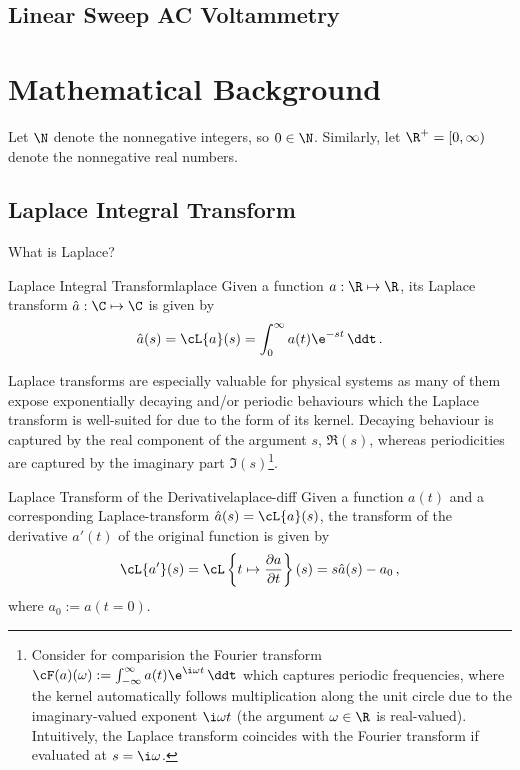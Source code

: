 \documentclass{prettytex/ox/mmsc-special-topic}
\begin{document}
  \subsection{Linear Sweep AC Voltammetry}

  \section{Mathematical Background}
  Let $\N$ denote the nonnegative integers, so $0 \in \N$.
  Similarly, let $\R^+ = [0, \infty)$ denote the nonnegative real numbers.

  \subsection{Laplace Integral Transform}
  What is Laplace?

  \begin{definition}{Laplace Integral Transform}{laplace}
    Given a function $a: \R \mapsto \R$, its Laplace transform $\hat{a}: \C \mapsto \C$ is given by
    $$\hat{a}(s) = \cL\{a\}(s) = \int_{0}^{\infty} a(t) \e^{-st} \,\ddt\,.$$
  \end{definition}

  Laplace transforms are especially valuable for physical systems as many of them expose exponentially decaying and/or periodic behaviours which the Laplace transform is well-suited for due to the form of its kernel.
  Decaying behaviour is captured by the real component of the argument $s$, $\Re(s)$, whereas periodicities are captured by the imaginary part $\Im(s)$\footnote{Consider for comparision the Fourier transform $\cF(a)(\omega) := \int_{-\infty}^{\infty} a(t) \e^{\i \omega t} \,\ddt$ which captures periodic frequencies, where the kernel automatically follows multiplication along the unit circle due to the imaginary-valued exponent $\i\omega t$ (the argument $\omega \in \R$ is real-valued). Intuitively, the Laplace transform coincides with the Fourier transform if evaluated at $s = \i \omega$.}.

  \begin{theorem}{Laplace Transform of the Derivative}{laplace-diff}
    Given a function $a(t)$ and a corresponding Laplace-transform $\hat{a}(s) = \cL\{a\}(s)$, the transform of the derivative $a'(t)$ of the original function is given by
    $$\cL\{a'\}(s) = \cL\left\{t \mapsto \frac{\partial a}{\partial t}\right\}(s) = s\hat{a}(s) - a_0\,,$$
    where $a_0 := a(t=0)$.
  \end{theorem}
\end{document}
